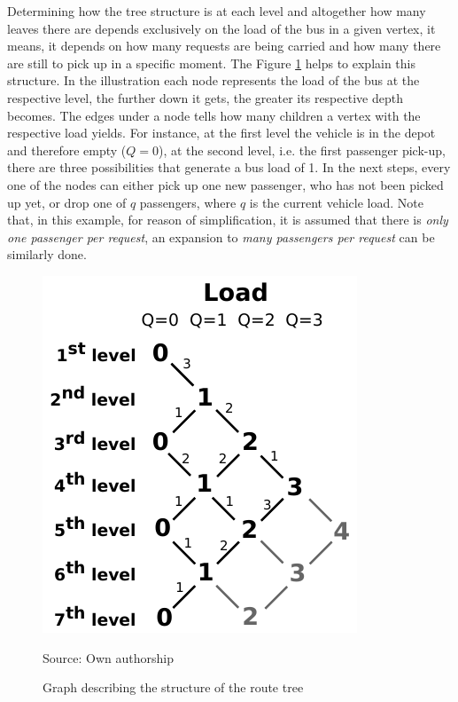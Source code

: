 \documentclass[tuberlin,cic,tc,openright,english,noabntcite,oneside]{iiufrgs}
\begin{document}
Determining how the tree structure is at each level and altogether how many leaves there are depends exclusively on the load of the bus in a given vertex, it means, it depends on how many requests are being carried and how many there are still to pick up in a specific moment. The Figure \ref{fig:load_bus_scheme} helps to explain this structure. In the illustration each node represents the load of the bus at the respective level, the further down it gets, the greater its respective depth becomes. The edges under a node tells how many children a vertex with the respective load yields. For instance, at the first level the vehicle is in the depot and therefore empty ($Q=0$), at the second level, i.e. the first passenger pick-up, there are three possibilities that generate a bus load of 1. In the next steps, every one of the nodes can either pick up one new passenger, who has not been picked up yet, or drop one of $q$ passengers, where $q$ is the current vehicle load. Note that, in this example, for reason of simplification, it is assumed that there is \emph{only one passenger per request}, an expansion to \emph{many passengers per request} can be similarly done.
\begin{figure}[H]
	\centering
    \caption{Graph describing the structure of the route tree}
    \includegraphics{fig_load_bus_scheme}\par
	Source: Own authorship
    \label{fig:load_bus_scheme}
\end{figure}
\end{document}
